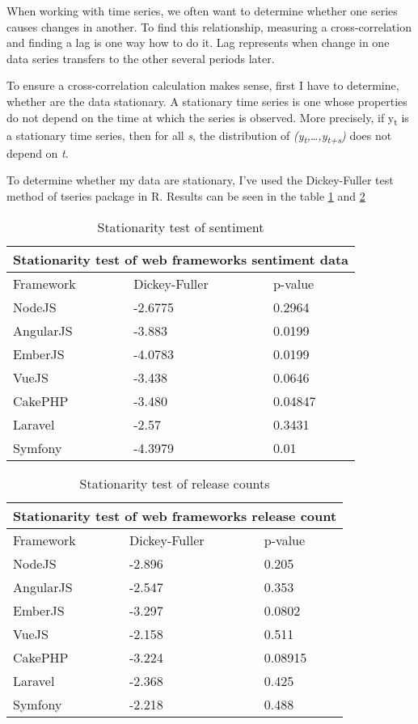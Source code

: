 When working with time series, we often want to determine whether one series causes changes in another. To find this relationship, measuring a cross-correlation and finding a lag is one way how to do it. Lag represents when change in one data series transfers to the other several periods later. 

To ensure a cross-correlation calculation makes sense, first I have to determine, whether are the data stationary. A stationary time series is one whose properties do not depend on the time at which the series is observed\cite{hyndman5forecast}. More precisely, if y\textsubscript{t} is a stationary time series, then for all \textit{s}, the distribution of \textit{(y\textsubscript{t},…,y\textsubscript{t+s})} does not depend on \textit{t}.

To determine whether my data are stationary, I've used the Dickey-Fuller test method of tseries package in R. Results can be seen in the table \ref{table:stationarity_table_sentiment} and \ref{table:stationarity_table_release_count} 

\begin{table}[H]
\centering
\begin{tabular}{ |p{3cm}||p{3cm}|p{3cm}|  }
 \hline
 \multicolumn{3}{|c|}{Stationarity test of web frameworks sentiment data} \\
 \hline
 Framework & Dickey-Fuller & p-value\\
 \hline
 NodeJS   & -2.6775    &0.2964\\ \hline
 AngularJS &   -3.883  & 0.0199\\ \hline
 EmberJS & -4.0783 & 0.0199\\ \hline
 VueJS    &-3.438 & 0.0646\\ \hline
 CakePHP&   -3.480  & 0.04847\\ \hline
 Laravel& -2.57  & 0.3431\\ \hline
 Symfony& -4.3979  & 0.01\\ \hline
\end{tabular}
\caption{Stationarity test of sentiment}
\label{table:stationarity_table_sentiment}
\end{table}

\begin{table}[H]
\centering
\begin{tabular}{ |p{3cm}||p{3cm}|p{3cm}|  }
 \hline
 \multicolumn{3}{|c|}{Stationarity test of web frameworks release count} \\
 \hline
 Framework & Dickey-Fuller & p-value\\
 \hline
 NodeJS   & -2.896    &0.205\\ \hline
 AngularJS &   -2.547  & 0.353\\ \hline
 EmberJS & -3.297 & 0.0802\\ \hline
 VueJS    &-2.158 & 0.511\\ \hline
 CakePHP&   -3.224  & 0.08915\\ \hline
 Laravel& -2.368  & 0.425\\ \hline
 Symfony& -2.218  & 0.488\\ \hline
\end{tabular}
\caption{Stationarity test of release counts}
\label{table:stationarity_table_release_count}
\end{table}

